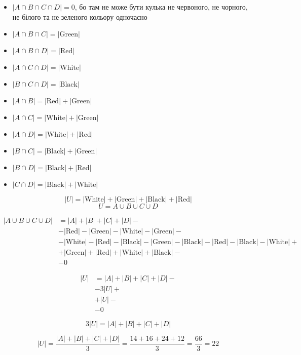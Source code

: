 \documentclass[11pt, a4paper]{article} %
\begin{document}
\begin{itemize}
    \item $|A\cap B \cap C\cap D| = 0$, бо там не може бути кулька не червоного, не чорного, не білого та не зеленого кольору одночасно
    \item $|A \cap B \cap C| = |\text{Green}|$
    \item $|A \cap B \cap D| = |\text{Red}|$
    \item $|A \cap C \cap D| = |\text{White}|$
    \item $|B \cap C \cap D| = |\text{Black}|$
    \item $|A\cap B| = |\text{Red}| + |\text{Green}|$
    \item $|A\cap C| = |\text{White}| + |\text{Green}|$
    \item $|A\cap D| = |\text{White}| + |\text{Red}|$
    \item $|B\cap C| = |\text{Black}| + |\text{Green}|$
    \item $|B\cap D| = |\text{Black}| + |\text{Red}|$
    \item $|C\cap D| = |\text{Black}| + |\text{White}|$
\end{itemize}

$$|U| = |\text{White}| + |\text{Green}| + |\text{Black}| + |\text{Red}|$$
$$U = A \cup B \cup C \cup D$$


\begin{align*}
    |A \cup B \cup C \cup D| &= |A| + |B| + |C| + |D| - \\
        &- |\text{Red}| - |\text{Green}| - |\text{White}| - |\text{Green}| -\\
        &- |\text{White}| - |\text{Red}| - |\text{Black}| - |\text{Green}| - |\text{Black}| - |\text{Red}| - |\text{Black}| - |\text{White}| + \\
        &+ |\text{Green}| + |\text{Red}| + |\text{White}| + |\text{Black}| -\\
        &- 0
\end{align*}

\begin{align*}
    |U| &= |A| + |B| + |C| + |D| - \\
        &- 3|U| + \\
        &+ |U| -\\
        &- 0
\end{align*}

$$3|U| = |A| + |B| + |C| + |D|$$
\begin{mdframed}[style=ans]
    $$|U| = \frac{|A| + |B| + |C| + |D|}{3} = \frac{14 + 16 + 24 + 12}{3} = \frac{66}{3} = 22$$
\end{mdframed}
\end{document}
